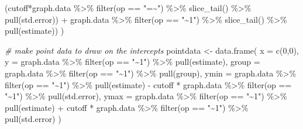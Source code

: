 \documentclass[
  man]{apa6}
\newenvironment{Shaded}{\begin{snugshade}}{\end{snugshade}}
\newcommand{\AttributeTok}[1]{\textcolor[rgb]{0.77,0.63,0.00}{#1}}
\newcommand{\CommentTok}[1]{\textcolor[rgb]{0.56,0.35,0.01}{\textit{#1}}}
\newcommand{\DecValTok}[1]{\textcolor[rgb]{0.00,0.00,0.81}{#1}}
\newcommand{\FunctionTok}[1]{\textcolor[rgb]{0.00,0.00,0.00}{#1}}
\newcommand{\NormalTok}[1]{#1}
\newcommand{\OtherTok}[1]{\textcolor[rgb]{0.56,0.35,0.01}{#1}}
\newcommand{\SpecialCharTok}[1]{\textcolor[rgb]{0.00,0.00,0.00}{#1}}
\newcommand{\StringTok}[1]{\textcolor[rgb]{0.31,0.60,0.02}{#1}}
\begin{document}
\begin{Shaded}
\begin{Highlighting}[]
\NormalTok{               (cutoff}\SpecialCharTok{*}\NormalTok{graph.data }\SpecialCharTok{\%\textgreater{}\%} \FunctionTok{filter}\NormalTok{(op }\SpecialCharTok{==} \StringTok{"=\textasciitilde{}"}\NormalTok{) }\SpecialCharTok{\%\textgreater{}\%} 
                      \FunctionTok{slice\_tail}\NormalTok{() }\SpecialCharTok{\%\textgreater{}\%} \FunctionTok{pull}\NormalTok{(std.error)) }\SpecialCharTok{+}
\NormalTok{               graph.data }\SpecialCharTok{\%\textgreater{}\%} \FunctionTok{filter}\NormalTok{(op }\SpecialCharTok{==} \StringTok{"\textasciitilde{}1"}\NormalTok{) }\SpecialCharTok{\%\textgreater{}\%} 
                   \FunctionTok{slice\_tail}\NormalTok{() }\SpecialCharTok{\%\textgreater{}\%} \FunctionTok{pull}\NormalTok{(estimate))}
\NormalTok{  )}
  
  \CommentTok{\# make point data to draw on the intercepts }
\NormalTok{  pointdata }\OtherTok{\textless{}{-}} \FunctionTok{data.frame}\NormalTok{(}
  \AttributeTok{x =} \FunctionTok{c}\NormalTok{(}\DecValTok{0}\NormalTok{,}\DecValTok{0}\NormalTok{),}
  \AttributeTok{y =}\NormalTok{ graph.data }\SpecialCharTok{\%\textgreater{}\%} \FunctionTok{filter}\NormalTok{(op }\SpecialCharTok{==} \StringTok{"\textasciitilde{}1"}\NormalTok{) }\SpecialCharTok{\%\textgreater{}\%} \FunctionTok{pull}\NormalTok{(estimate), }
  \AttributeTok{group =}\NormalTok{ graph.data }\SpecialCharTok{\%\textgreater{}\%} \FunctionTok{filter}\NormalTok{(op }\SpecialCharTok{==} \StringTok{"\textasciitilde{}1"}\NormalTok{) }\SpecialCharTok{\%\textgreater{}\%} \FunctionTok{pull}\NormalTok{(group),}
  \AttributeTok{ymin =}\NormalTok{ graph.data }\SpecialCharTok{\%\textgreater{}\%} \FunctionTok{filter}\NormalTok{(op }\SpecialCharTok{==} \StringTok{"\textasciitilde{}1"}\NormalTok{) }\SpecialCharTok{\%\textgreater{}\%} \FunctionTok{pull}\NormalTok{(estimate) }\SpecialCharTok{{-}} 
\NormalTok{    cutoff }\SpecialCharTok{*}\NormalTok{ graph.data }\SpecialCharTok{\%\textgreater{}\%} \FunctionTok{filter}\NormalTok{(op }\SpecialCharTok{==} \StringTok{"\textasciitilde{}1"}\NormalTok{) }\SpecialCharTok{\%\textgreater{}\%} \FunctionTok{pull}\NormalTok{(std.error), }
  \AttributeTok{ymax =}\NormalTok{ graph.data }\SpecialCharTok{\%\textgreater{}\%} \FunctionTok{filter}\NormalTok{(op }\SpecialCharTok{==} \StringTok{"\textasciitilde{}1"}\NormalTok{) }\SpecialCharTok{\%\textgreater{}\%} \FunctionTok{pull}\NormalTok{(estimate) }\SpecialCharTok{+} 
\NormalTok{    cutoff }\SpecialCharTok{*}\NormalTok{ graph.data }\SpecialCharTok{\%\textgreater{}\%} \FunctionTok{filter}\NormalTok{(op }\SpecialCharTok{==} \StringTok{"\textasciitilde{}1"}\NormalTok{) }\SpecialCharTok{\%\textgreater{}\%} \FunctionTok{pull}\NormalTok{(std.error)}
\NormalTok{  )}
  

\end{Highlighting}
\end{Shaded}
\end{document}
